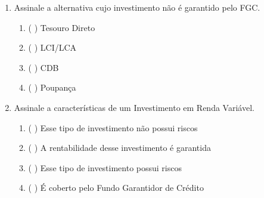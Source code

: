 \begin{enumerate}
    \item Assinale a alternativa cujo investimento não é garantido pelo FGC.
        \begin{enumerate}
            \item (   ) Tesouro Direto
            \item (   ) LCI/LCA
            \item (   ) CDB
            \item (   ) Poupança
        \end{enumerate}
        
    \item Assinale a características de um Investimento em Renda Variável.
        \begin{enumerate}
            \item (   ) Esse tipo de investimento não possui riscos 
            \item (   ) A rentabilidade desse investimento é garantida
            \item (   ) Esse tipo de investimento possui riscos
            \item (   ) É coberto pelo Fundo Garantidor de Crédito
        \end{enumerate}
\end{enumerate}
